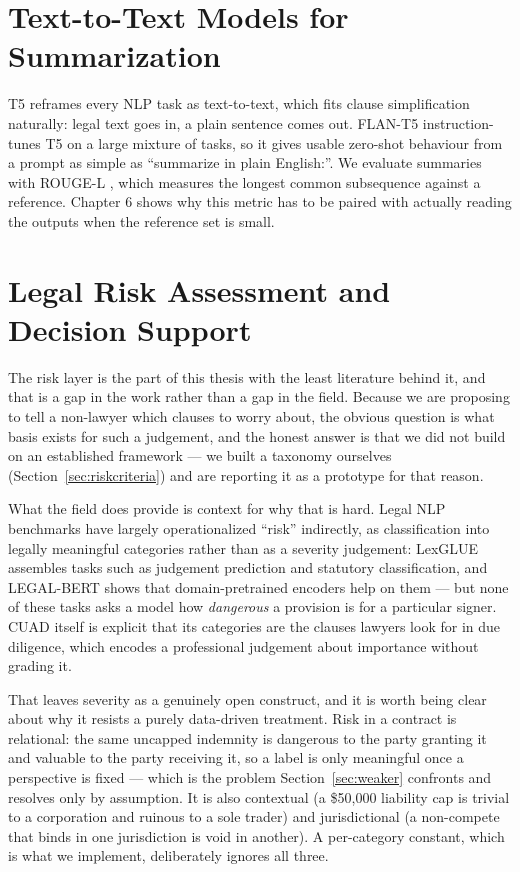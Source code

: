 \section{Text-to-Text Models for Summarization}
T5 \cite{raffel2020t5} reframes every NLP task as text-to-text, which fits clause simplification naturally: legal text goes in, a plain sentence comes out. FLAN-T5 \cite{chung2022flan} instruction-tunes T5 on a large mixture of tasks, so it gives usable zero-shot behaviour from a prompt as simple as ``summarize in plain English:''. We evaluate summaries with ROUGE-L \cite{lin2004rouge}, which measures the longest common subsequence against a reference. Chapter 6 shows why this metric has to be paired with actually reading the outputs when the reference set is small.

\section{Legal Risk Assessment and Decision Support}
\label{sec:lit_risk}
The risk layer is the part of this thesis with the least literature behind it, and that is a gap in the work rather than a gap in the field. Because we are proposing to tell a non-lawyer which clauses to worry about, the obvious question is what basis exists for such a judgement, and the honest answer is that we did not build on an established framework --- we built a taxonomy ourselves (Section~\ref{sec:riskcriteria}) and are reporting it as a prototype for that reason.

What the field does provide is context for why that is hard. Legal NLP benchmarks have largely operationalized ``risk'' indirectly, as classification into legally meaningful categories rather than as a severity judgement: LexGLUE \cite{chalkidis2022lexglue} assembles tasks such as judgement prediction and statutory classification, and LEGAL-BERT \cite{chalkidis2020legalbert} shows that domain-pretrained encoders help on them --- but none of these tasks asks a model how \emph{dangerous} a provision is for a particular signer. CUAD itself \cite{hendrycks2021cuad} is explicit that its categories are the clauses lawyers look for in due diligence, which encodes a professional judgement about importance without grading it.

That leaves severity as a genuinely open construct, and it is worth being clear about why it resists a purely data-driven treatment. Risk in a contract is relational: the same uncapped indemnity is dangerous to the party granting it and valuable to the party receiving it, so a label is only meaningful once a perspective is fixed --- which is the problem Section~\ref{sec:weaker} confronts and resolves only by assumption. It is also contextual (a \$50{,}000 liability cap is trivial to a corporation and ruinous to a sole trader) and jurisdictional (a non-compete that binds in one jurisdiction is void in another). A per-category constant, which is what we implement, deliberately ignores all three.

